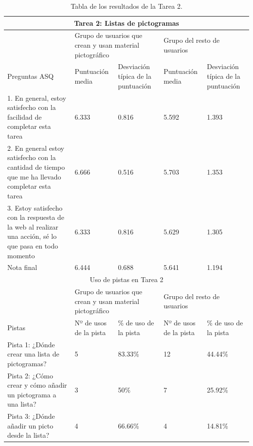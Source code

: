 \begin{table}
\begin{tabular}{ |p{4cm}|p{2cm}|p{2cm}|p{2cm}|p{2cm}|  }
	\hline
	\multicolumn{5}{|c|}{Tarea 2: Listas de pictogramas} \\
	\hline
	& \multicolumn{2}{p{4cm}|}{Grupo de usuarios que crean y usan material pictográfico} & \multicolumn{2}{p{4cm}|}{Grupo del resto de usuarios }  \\ 
	\hline
	Preguntas ASQ & Puntuación media  &Desviación típica de la puntuación & Puntuación media & Desviación típica de la puntuación\\
	\hline
	1. En general, estoy satisfecho con la facilidad de completar esta tarea &6.333  &0.816 &5.592 &1.393\\
	\hline
	2. En general estoy satisfecho con la cantidad de tiempo que me ha llevado completar esta tarea &6.666  &0.516 &5.703 &1.353\\
	\hline
	3. Estoy satisfecho con la respuesta de la web al realizar una acción, sé lo que pasa en todo momento &6.333 &0.816 &5.629   &1.305\\
	\hline
	Nota final &6.444 &0.688 &5.641  &1.194\\
	\hline
	\multicolumn{5}{|c|}{Uso de pistas en Tarea 2} \\
	\hline
	& \multicolumn{2}{p{4cm}|}{Grupo de usuarios que crean y usan material pictográfico} & \multicolumn{2}{p{4cm}|}{Grupo del resto de usuarios }  \\ 
	\hline
	Pistas &Nº de usos de la pista &\% de uso de la pista&Nº de usos de la pista&\% de uso de la pista\\
	\hline
	Pista 1: ¿Dónde crear una lista de pictogramas? &5  &83.33\% &12 &44.44\%\\
	\hline
	Pista 2: ¿Cómo crear y cómo añadir un pictograma a una lista? &3  &50\%  &7 &25.92\%\\
	\hline
	Pista 3: ¿Dónde añadir un picto desde la lista? &4 &66.66\% &4  &14.81\%\\
	\hline
\end{tabular}
\caption{\label{tab:area2respuestas}Tabla de los resultados de la Tarea 2.}
\end{table}


